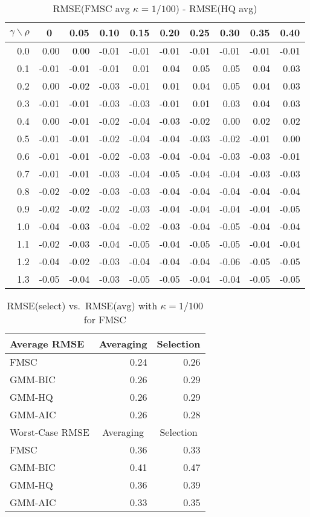 \documentclass[12pt]{article}
\begin{document}
\begin{table}[!tbp]
\caption{RMSE(FMSC avg $\kappa = 1/100$) - RMSE(HQ avg)}
 \begin{center}
 \begin{tabular}{r|rrrrrrrrr}\hline\hline
\multicolumn{1}{c|}{$\gamma\backslash\rho$}&\multicolumn{1}{c}{0}&\multicolumn{1}{c}{0.05}&\multicolumn{1}{c}{0.10}&\multicolumn{1}{c}{0.15}&\multicolumn{1}{c}{0.20}&\multicolumn{1}{c}{0.25}&\multicolumn{1}{c}{0.30}&\multicolumn{1}{c}{0.35}&\multicolumn{1}{c}{0.40}\tabularnewline
\hline

0.0& 0.00& 0.00&-0.01&-0.01&-0.01&-0.01&-0.01&-0.01&-0.01\tabularnewline
0.1&-0.01&-0.01&-0.01& 0.01& 0.04& 0.05& 0.05& 0.04& 0.03\tabularnewline
0.2& 0.00&-0.02&-0.03&-0.01& 0.01& 0.04& 0.05& 0.04& 0.03\tabularnewline
0.3&-0.01&-0.01&-0.03&-0.03&-0.01& 0.01& 0.03& 0.04& 0.03\tabularnewline
0.4& 0.00&-0.01&-0.02&-0.04&-0.03&-0.02& 0.00& 0.02& 0.02\tabularnewline
0.5&-0.01&-0.01&-0.02&-0.04&-0.04&-0.03&-0.02&-0.01& 0.00\tabularnewline
0.6&-0.01&-0.01&-0.02&-0.03&-0.04&-0.04&-0.03&-0.03&-0.01\tabularnewline
0.7&-0.01&-0.01&-0.03&-0.04&-0.05&-0.04&-0.04&-0.03&-0.03\tabularnewline
0.8&-0.02&-0.02&-0.03&-0.03&-0.04&-0.04&-0.04&-0.04&-0.04\tabularnewline
0.9&-0.02&-0.02&-0.02&-0.03&-0.04&-0.04&-0.04&-0.04&-0.05\tabularnewline
1.0&-0.04&-0.03&-0.04&-0.02&-0.03&-0.04&-0.05&-0.04&-0.04\tabularnewline
1.1&-0.02&-0.03&-0.04&-0.05&-0.04&-0.05&-0.05&-0.04&-0.04\tabularnewline
1.2&-0.04&-0.02&-0.03&-0.04&-0.04&-0.04&-0.06&-0.05&-0.05\tabularnewline
1.3&-0.05&-0.04&-0.03&-0.05&-0.05&-0.04&-0.04&-0.05&-0.05\tabularnewline
\hline
\end{tabular}

\end{center}

\end{table}


%
\begin{table}[!tbp]
 \begin{center}
\caption{RMSE(select) vs.\ RMSE(avg) with $\kappa = 1/100$ for FMSC}
 \begin{tabular}{lrr}\hline\hline
\multicolumn{1}{l}{Average RMSE}&\multicolumn{1}{c}{Averaging}&\multicolumn{1}{c}{Selection}\tabularnewline
\hline
FMSC&0.24&0.26\tabularnewline
GMM-BIC&0.26&0.29\tabularnewline
GMM-HQ&0.26&0.29\tabularnewline
GMM-AIC&0.26&0.28\tabularnewline
\hline
\multicolumn{1}{l}{Worst-Case RMSE}&\multicolumn{1}{c}{Averaging}&\multicolumn{1}{c}{Selection}\tabularnewline
\hline
FMSC&0.36&0.33\tabularnewline
GMM-BIC&0.41&0.47\tabularnewline
GMM-HQ&0.36&0.39\tabularnewline
GMM-AIC&0.33&0.35\tabularnewline
\hline
\end{tabular}

\end{center}

\end{table}
\end{document}
